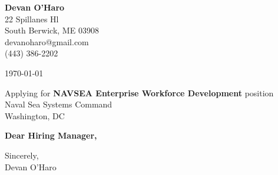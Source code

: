 \documentclass[12pt]{article}
\makeatletter
\newcommand{\yourname}{Devan O'Haro}
\newcommand{\youraddress}{22 Spillanes Hl}
\newcommand{\yourcitystatezip}{South Berwick, ME 03908}
\newcommand{\youremail}{devanoharo@gmail.com}
\newcommand{\yourphone}{(443) 386-2202}
\newcommand{\dateofletter}{\today}
\newcommand{\recipient}{Hiring Manager}
\newcommand{\companyname}{Naval Sea Systems Command}
\newcommand{\companycitystatezip}{Washington, DC}
\newcommand{\job}{NAVSEA Enterprise Workforce Development}
\makeatother
\begin{document}
\noindent
\begin{minipage}[t]{0.6\textwidth}
    \textbf{\yourname} \\
    \youraddress \\
    \yourcitystatezip \\
    \youremail \\
    \yourphone
\end{minipage}%
\hfill
\begin{minipage}[t]{0.35\textwidth}
    \raggedleft
    \dateofletter
\end{minipage}
\vspace{2em}

\noindent
Applying for \textbf{\job} position\\
\companyname \\
\companycitystatezip \\
\vspace{2em}

\noindent
\textbf{Dear \recipient,} \\
\vspace{1em}

\noindent
\vspace{1em}

\noindent
Sincerely, \\
\vspace{2em}
\yourname
\end{document}
